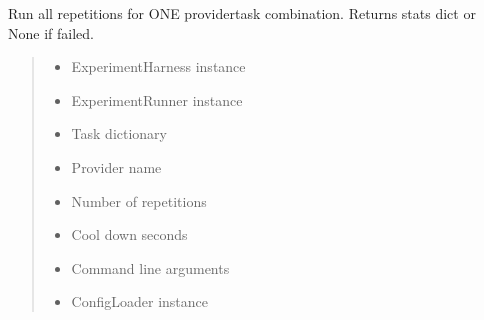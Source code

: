 \documentclass[letterpaper,10pt,english]{sphinxmanual}
\begin{document}
\begin{fulllineitems}
\label{\detokenize{core.execution.tests.run_experiment:core.execution.tests.run_experiment.run_provider_task}}
\pysigstartsignatures
\pysiglinewithargsret
{}
{\sphinxparamcomma {}\sphinxparamcomma {}\sphinxparamcomma {}\sphinxparamcomma {}\sphinxparamcomma {}\sphinxparamcomma {}\sphinxparamcomma {}}
{}
\pysigstopsignatures
\sphinxAtStartPar
Run all repetitions for ONE provider\sphinxhyphen{}task combination.
Returns stats dict or None if failed.
\begin{quote}\begin{description}
\begin{itemize}
\item {} 
\sphinxAtStartPar
{} \textendash{} ExperimentHarness instance

\item {} 
\sphinxAtStartPar
{} \textendash{} ExperimentRunner instance

\item {} 
\sphinxAtStartPar
{} \textendash{} Task dictionary

\item {} 
\sphinxAtStartPar
{} \textendash{} Provider name

\item {} 
\sphinxAtStartPar
{} \textendash{} Number of repetitions

\item {} 
\sphinxAtStartPar
{} \textendash{} Cool down seconds

\item {} 
\sphinxAtStartPar
{} \textendash{} Command line arguments

\item {} 
\sphinxAtStartPar
{} \textendash{} ConfigLoader instance

\end{itemize}

\end{description}\end{quote}

\end{fulllineitems}
\end{document}
